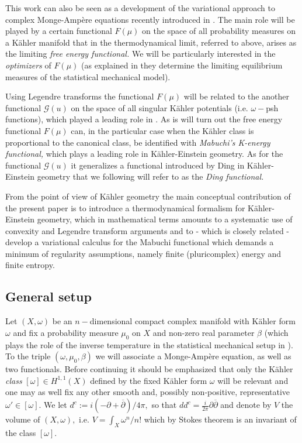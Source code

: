 \documentclass[11pt,oneside,english]{amsart}
\numberwithin{equation}{section}
\numberwithin{figure}{section}
\theoremstyle{plain}
\theoremstyle{plain}
\theoremstyle{plain}
\theoremstyle{plain}
\theoremstyle{remark}
\theoremstyle{definition}
\begin{document}
This work can also be seen as a development of the variational approach
to complex Monge-Ampère equations recently introduced in \cite{bbgz}.
The main role will be played by a certain functional $F(\mu)$ on
the space of all probability measures on a Kähler manifold that in
the thermodynamical limit, referred to above, arises as the limiting
\emph{free energy functional.} We will be particularly interested
in the \emph{optimizers} of $F(\mu)$ (as explained in \cite{b1}
they determine the limiting equilibrium measures of the statistical
mechanical model).

Using Legendre transforms the functional $F(\mu)$ will be related
to the another functional $\mathcal{G}(u)$ on the space of all singular
Kähler potentials (i.e. $\omega-$psh functions), which played a leading
role in \cite{bbgz}. As is will turn out the free energy functional
$F(\mu)$ can, in the particular case when the Kähler class is proportional
to the canonical class, be identified with \emph{Mabuchi's K-energy
functional, }which plays a leading role in Kähler-Einstein geometry.
As for the functional $\mathcal{G}(u)$ it generalizes a functional
introduced by Ding \cite{din} in Kähler-Einstein geometry that we
following \cite{rub1} will refer to as the \emph{Ding functional.}

From the point of view of Kähler geometry the main conceptual contribution
of the present paper is to introduce a thermodynamical formalism for
Kähler-Einstein geometry, which in mathematical terms amounts to a
systematic use of convexity and Legendre transform arguments and to
- which is closely related - develop a variational calculus for the
Mabuchi functional which demands a minimum of regularity assumptions,
namely finite (pluricomplex) energy and finite entropy.

\subsection{General setup}

Let $(X,\omega)$ be an $n-$dimensional compact complex manifold
with Kähler form $\omega$ and fix a probability measure $\mu_{0}$
on $X$ and non-zero real parameter $\beta$ (which plays the role
of the inverse temperature in the statistical mechanical setup in
\cite{b1}). To the triple $(\omega,\mu_{0},\beta)$ we will associate
a Monge-Ampère equation, as well as two functionals. Before continuing
it should be emphasized that only the Kähler\emph{ class} $[\omega]\in H^{1,1}(X)$
defined by the fixed Kähler form $\omega$ will be relevant and one
may as well fix any other smooth and, possibly non-positive, representative
$\omega'\in[\omega].$ We let $d^{c}:=i(-\partial+\overline{\partial})/4\pi,$
so that $dd^{c}=\frac{i}{2\pi}\partial\overline{\partial}$ and denote
by $V$ the volume of $(X,\omega),$ i.e. $V=\int_{X}\omega^{n}/n!$
which by Stokes theorem is an invariant of the class $[\omega].$
\end{document}
